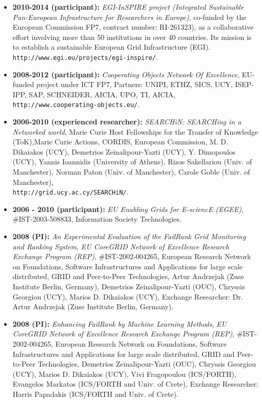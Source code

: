 \documentclass[10pt]{article}
\begin{document}
\begin{itemize}
\item  {\bf 2010-2014 (participant):} {\em EGI-InSPIRE project (Integrated Sustainable Pan-European Infrastructure for Researchers in Europe)}, co-funded by the European Commission FP7, contract number: RI-261323), as a collaborative effort involving more than 50 institutions in over 40 countries. Its mission is to establish a sustainable European Grid Infrastructure (EGI).  {\tt http://www.egi.eu/projects/egi-inspire/}.

\item  {\bf 2008-2012 (participant):} {\em Cooperating Objects Network Of Excellence}, EU-funded project under ICT FP7, Partners: UNIPI, ETHZ, SICS, UCY, ISEP-IPP, SAP, SCHNEIDER, AICIA, UPO, TI, AICIA, {\tt http://www.cooperating-objects.eu/}.


\item  {\bf 2006-2010 (experienced researcher):} {\em SEARCHiN: SEARCHing in a Networked world}, Marie Curie Host Fellowships for the Transfer of Knowledge (ToK),Marie Curie Actions, CORDIS, European Commission, M. D. Dikaiakos (UCY), Demetrios Zeinalipour-Yazti (UCY), Y. Dimopoulos (UCY), Yannis Ioannidis (University of Athens), Rizos Sakellariou (Univ. of Manchester), Norman Paton (Univ. of Manchester), Carole Goble (Univ. of Manchester), \\
 {\tt http://grid.ucy.ac.cy/SEARCHiN/}.


\item {\bf 2006 - 2010 (participant):} {\em EU Enabling Grids for E-sciencE (EGEE)}, \#IST-2003-508833, Information Society Technologies.

\item  {\bf 2008 (PI):} {\em An Experimental Evaluation of the FailRank Grid Monitoring and Ranking System},
{\em EU CoreGRID Network of Excellence Research Exchange Program (REP)}, \#IST-2002-004265, European Research Network on Foundations, Software Infrastructures and Applications for large scale distributed, GRID and Peer-to-Peer Technologies, Artur Andrzejak (Zuse Institute Berlin, Germany), Demetrios Zeinalipour-Yazti (OUC), Chryssis Georgiou (UCY), Marios D. Dikaiakos (UCY), Exchange Researcher: Dr. Artur Andrzejak (Zuse Institute Berlin, Germany).

\item  {\bf 2008 (PI):}  {\em Enhancing FailRank by Machine Learning Methods},
{\em EU CoreGRID Network of Excellence Research Exchange Program (REP)}, \#IST-2002-004265, European Research Network on Foundations, Software Infrastructures and Applications for large scale distributed, GRID and Peer-to-Peer Technologies, Demetrios Zeinalipour-Yazti (OUC), Chryssis Georgiou (UCY), Marios D. Dikaiakos (UCY), Vivi  Fragopoulou (ICS/FORTH), Evangelos Markatos (ICS/FORTH and Univ. of Crete),  Exchange Researcher: Harris Papadakis (ICS/FORTH and Univ. of Crete).


\end{itemize}
\end{document}
